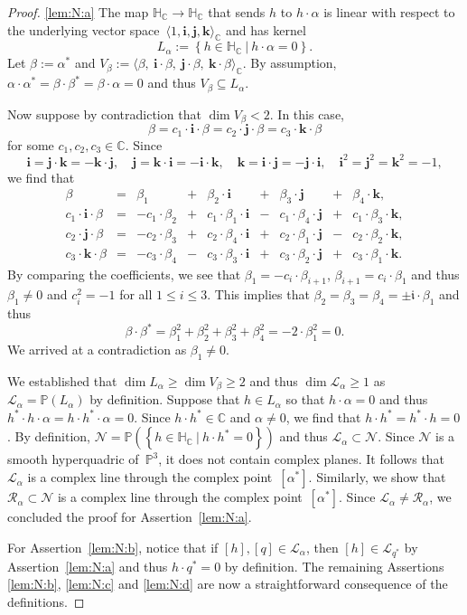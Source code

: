 \documentclass[11pt]{article}
\newcommand{\C}{\mathbb{C}}
\renewcommand{\P}{\mathbb{P}}
\newcommand{\cN}{\mathcal{N}}
\newcommand{\cL}{\mathcal{L}}
\newcommand{\cR}{\mathcal{R}}
\newcommand{\HC}{\mathbb{H}_{\C}}
\newcommand{\qi}{\mathbf{i}}
\newcommand{\qj}{\mathbf{j}}
\newcommand{\qk}{\mathbf{k}}
\newcommand{\ii}{\mathfrak{i}}
\newcommand{\set}[2]{\left\{#1 ~|~ #2\right\}}
\begin{document}
\begin{proof}
\ref{lem:N:a}
The map $\HC\to\HC$ that sends $h$ to $h\cdot\alpha$ is linear
with respect to the underlying vector space~$\langle 1,\qi,\qj,\qk \rangle_\C$
and has kernel
\[
L_\alpha:=\set{h\in\HC}{h\cdot\alpha=0}.
\]
Let
$\beta:=\alpha^*$ and
$V_\beta:=\langle \beta,~\qi\cdot\beta,~\qj\cdot\beta,~\qk\cdot\beta\rangle_\C$.
By assumption,
$
\alpha\cdot\alpha^*=
\beta\cdot\beta^*=
\beta\cdot\alpha=0$ and thus $V_\beta\subseteq L_\alpha$.

Now suppose by contradiction that $\dim V_\beta<2$.
In this case,
\[
\beta=c_1\cdot\qi\cdot\beta=c_2\cdot\qj\cdot\beta=c_3\cdot\qk\cdot\beta
\]
for some $c_1,c_2,c_3\in\C$. Since
\[
\qi=\qj\cdot\qk=-\qk\cdot\qj,\quad
\qj=\qk\cdot\qi=-\qi\cdot\qk,\quad
\qk=\qi\cdot\qj=-\qj\cdot\qi,\quad
\qi^2=\qj^2=\qk^2=-1,
\]
we find that
\[
\begin{array}{rlrlrlrlr}
                \beta &=&          \beta_1 &+&         \beta_2\cdot\qi &+&         \beta_3\cdot\qj &+&         \beta_4\cdot\qk, \\
c_1\cdot\qi\cdot\beta &=& -c_1\cdot\beta_2 &+& c_1\cdot\beta_1\cdot\qi &-& c_1\cdot\beta_4\cdot\qj &+& c_1\cdot\beta_3\cdot\qk, \\
c_2\cdot\qj\cdot\beta &=& -c_2\cdot\beta_3 &+& c_2\cdot\beta_4\cdot\qi &+& c_2\cdot\beta_1\cdot\qj &-& c_2\cdot\beta_2\cdot\qk, \\
c_3\cdot\qk\cdot\beta &=& -c_3\cdot\beta_4 &-& c_3\cdot\beta_3\cdot\qi &+& c_3\cdot\beta_2\cdot\qj &+& c_3\cdot\beta_1\cdot\qk.
\end{array}
\]
By comparing the coefficients, we see that
$\beta_1=-c_i\cdot\beta_{i+1}$,
$\beta_{i+1}=c_i\cdot\beta_1$
and thus
$\beta_1\neq 0$ and
$c_i^2=-1$
for all $1\leq i\leq 3$.
This implies that $\beta_2=\beta_3=\beta_4=\pm\ii\cdot\beta_1$
and thus
\[
\beta\cdot\beta^*=\beta_1^2+\beta_2^2+\beta_3^2+\beta_4^2=-2\cdot\beta_1^2=0.
\]
We arrived at a contradiction as $\beta_1\neq 0$.

We established that $\dim L_\alpha\geq \dim V_\beta\geq 2$ and thus $\dim \cL_\alpha\geq 1$
as $\cL_\alpha=\P(L_\alpha)$ by definition.
Suppose that $h\in L_\alpha$ so that $h\cdot\alpha=0$ and thus $h^*\cdot h\cdot\alpha=h\cdot h^*\cdot\alpha=0$.
Since $h\cdot h^*\in\C$ and $\alpha\neq 0$, we find that $h\cdot h^*=h^*\cdot h=0$.
By definition, $\cN=\P(\set{h\in\HC}{h\cdot h^*=0})$
and thus $\cL_\alpha\subset\cN$.
Since $\cN$ is a smooth hyperquadric of~$\P^3$, it does not contain complex planes.
It follows that $\cL_\alpha$ is a complex line through the complex point~$[\alpha^*]$.
Similarly, we show that $\cR_\alpha\subset\cN$ is a complex line through the complex point~$[\alpha^*]$.
Since $\cL_\alpha\neq\cR_\alpha$, we concluded the proof for Assertion~\ref{lem:N:a}.

For Assertion~\ref{lem:N:b},
notice that if $[h],[q]\in \cL_\alpha$, then
$[h]\in \cL_{q^*}$ by Assertion~\ref{lem:N:a} and thus $h\cdot q^*=0$ by definition.
The remaining Assertions \ref{lem:N:b}, \ref{lem:N:c} and \ref{lem:N:d}
are now a straightforward consequence of the definitions.
\end{proof}
\end{document}
